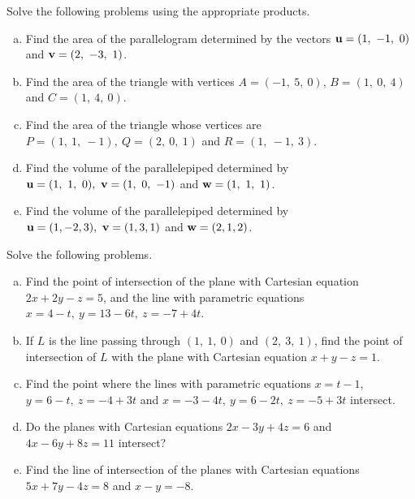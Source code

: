 \begin{prob}
\label{prob03.2}  Solve the following problems using the appropriate products.\medskip
\begin{enumerate}[a)]

\item Find the area of the parallelogram determined by the vectors
$\mathbf{u}=(1,\ -1,\ 0)$ and $\mathbf{v}=(2,\ -3,\ 1)$.    \medskip
%
\item\sov Find the area of the triangle with vertices $A=(-1,\ 5,\
0)$, $B=(1,\ 0,\ 4)$ and $C=(1,\ 4,\ 0)$.  \medskip
\item Find the area of the triangle whose vertices are $P=(1,\
1,\ -1),\ Q=(2,\ 0,\ 1)$ and $R=(1,\ -1,\ 3)$.  \medskip


\item\sov Find the volume of the parallelepiped  determined by $\mathbf{u}=(1,\ 1,\ 0),\ \mathbf{v}=(1,\ 0,\ -1)$ and $\mathbf{w}=(1,\ 1,\ 1)$.\medskip

\item Find the volume of the parallelepiped  determined by $\mathbf{u}=(1, -2, 3),\ \mathbf{v}=(1,3,1)$ and $\mathbf{w}=(2,1,2)$.\medskip

\end{enumerate}



\end{prob} \begin{prob} \label{prob03.3}  Solve the following problems. \medskip
\begin{enumerate}[a)]
\item\sov Find the point of intersection of the plane with Cartesian equation $2x+2y-z=5$,
and the line with parametric equations $x=4-t,\ y=13-6t,\ z=-7+4t$.  \medskip
\item\sov If $L$ is the line passing through $(1,\ 1,\ 0)$ and $(2,\
3,\ 1)$, find  the point of intersection of $L$ with the plane with Cartesian equation $x+y-z=1$. \medskip
\item  Find the point where the lines with parametric equations $x=t-1$,   $y=6-t,\ z=-4+3t$ and $x=-3- 4t,\ y=6-2t,\ z=-5+3t$ intersect. \medskip
\item\sov  Do the planes with Cartesian equations $2x-3y+4z=6$ and $4x-
6y+8z=11$ intersect? \medskip
\item Find the line of intersection of the planes with Cartesian equations $5x+7y-4z=8$ and $x-y=-8$. \medskip


\end{enumerate}
\end{prob}
